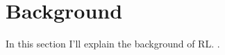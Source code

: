 \chapter{Background}
In this section I'll explain the background of RL. \cite{Yao2014}.

\printbibliography